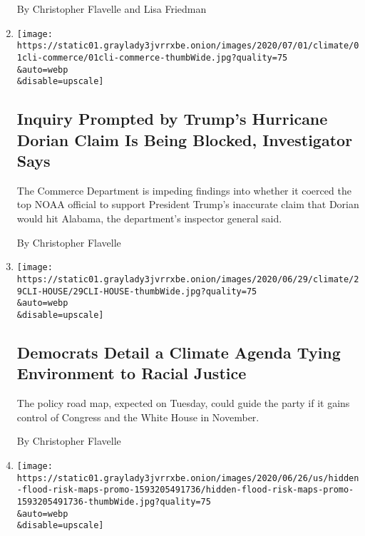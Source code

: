 \begin{enumerate}
  By Christopher Flavelle and Lisa Friedman
\item
  \href{/2020/07/01/climate/trump-dorian-noaa-investigation.html}{}

  \texttt{[image: https://static01.graylady3jvrrxbe.onion/images/2020/07/01/climate/01cli-commerce/01cli-commerce-thumbWide.jpg?quality=75\\\&auto=webp\\\&disable=upscale]}

  \hypertarget{inquiry-prompted-by-trumps-hurricane-dorian-claim-is-being-blocked-investigator-says}{%
  \subsection{Inquiry Prompted by Trump's Hurricane Dorian Claim Is
  Being Blocked, Investigator
  Says}\label{inquiry-prompted-by-trumps-hurricane-dorian-claim-is-being-blocked-investigator-says}}

  The Commerce Department is impeding findings into whether it coerced
  the top NOAA official to support President Trump's inaccurate claim
  that Dorian would hit Alabama, the department's inspector general
  said.

  By Christopher Flavelle
\item
  \href{/2020/06/29/climate/house-democrats-climate-plan.html}{}

  \texttt{[image: https://static01.graylady3jvrrxbe.onion/images/2020/06/29/climate/29CLI-HOUSE/29CLI-HOUSE-thumbWide.jpg?quality=75\\\&auto=webp\\\&disable=upscale]}

  \hypertarget{democrats-detail-a-climate-agenda-tying-environment-to-racial-justice}{%
  \subsection{Democrats Detail a Climate Agenda Tying Environment to
  Racial
  Justice}\label{democrats-detail-a-climate-agenda-tying-environment-to-racial-justice}}

  The policy road map, expected on Tuesday, could guide the party if it
  gains control of Congress and the White House in November.

  By Christopher Flavelle
\item
  \href{/interactive/2020/06/29/climate/hidden-flood-risk-maps.html}{}

  \texttt{[image: https://static01.graylady3jvrrxbe.onion/images/2020/06/26/us/hidden-flood-risk-maps-promo-1593205491736/hidden-flood-risk-maps-promo-1593205491736-thumbWide.jpg?quality=75\\\&auto=webp\\\&disable=upscale]}


\end{enumerate}
